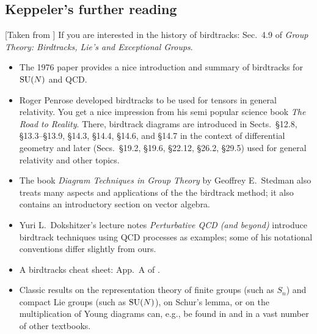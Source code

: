 \subsection{Keppeler's further reading}

[Taken from ]
If you are interested in the history of birdtracks:
Sec.~4.9 of {\em Group Theory: Birdtracks, Lie's and Exceptional Groups}.

\vspace{1ex}

\begin{itemize}
\item The 1976 paper provides a
  nice introduction and summary of birdtracks for $\textrm{SU}(N)$ and QCD.
\item Roger Penrose developed birdtracks to be used for tensors in
  general relativity. You get a nice impression from his semi
  popular science book {\it The Road to Reality}. There,
  birdtrack diagrams are introduced in Sects.~\S12.8, \S13.3--\S13.9,
  \S14.3, \S14.4, \S14.6, and \S14.7 in the context of differential
  geometry and later (Secs.~\S19.2, \S19.6, \S22.12, \S26.2, \S29.5)
  used for general relativity and other topics.
\item The book {\it Diagram Techniques in Group Theory} by Geoffrey
  E.\ Stedman also treats many aspects and applications
  of the the birdtrack method; it also contains an introductory
  section on vector algebra.
\item Yuri L.\ Dokshitzer's lecture notes {\it Perturbative QCD (and
    beyond)} introduce birdtrack techniques using
  QCD processes as examples; some of his notational conventions differ
  slightly from ours.
\item A birdtracks cheat sheet: App.~A of .
\end{itemize}

\begin{itemize}
\item Classic results on the representation theory of finite groups (such as
$S_n$) and compact Lie groups (such as $\textrm{SU}(N)$), on Schur's lemma, or
on the multiplication of Young diagrams can, e.g., be found in
  and in a vast number of other textbooks.
\end{itemize}

\vspace{1ex}

